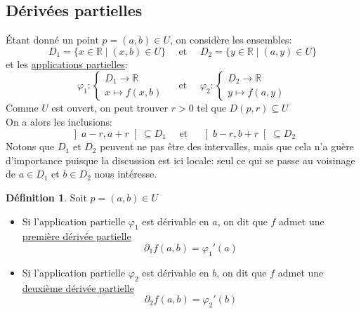 \documentclass[10pt,a4paper]{article}
\theoremstyle{definition}
\newtheorem{definition}[proposition]{Définition}
\begin{document}
\subsection{Dérivées partielles}
Étant donné un point $p = (a, b) \in U$, on considère les ensembles:
\[ D_1 = \{x \in \mathbb{R} \mid (x, b) \in U\} \quad \text{ et } \quad D_2 = \{ y \in \mathbb{R} \mid (a, y) \in U\} \]
et les \uline{applications partielles}:
\[ \varphi_1: \begin{cases}
D_1 \to \mathbb{R} \\
x \mapsto f(x, b)
\end{cases} \quad \text{ et } \quad
\varphi_2: \begin{cases}
D_2 \to \mathbb{R} \\
y \mapsto f(a, y)
\end{cases} \]
Comme $U$ est ouvert, on peut trouver $r > 0$ tel que $D(p, r) \subseteq U$ \\
On a alors les inclusions:
\[ \left] a - r, a + r \right[ \subseteq D_1 \quad \text{ et } \quad \left] b - r, b + r \right[ \subseteq D_2 \]
Notons que $D_1$ et $D_2$ peuvent ne pas être des intervalles, mais que cela n'a guère d'importance puisque la discussion est ici locale: seul ce qui se passe au voisinage de $a \in D_1$ et $b \in D_2$ nous intéresse.
\begin{definition}
Soit $p = (a, b) \in U$
\begin{itemize}
\item Si l'application partielle $\varphi_1$ est dérivable en $a$, on dit que $f$ admet une \uline{première dérivée partielle}
\[ \partial_1 f(a, b) = \varphi_1'(a) \]
\item Si l'application partielle $\varphi_2$ est dérivable en $b$, on dit que $f$ admet une \uline{deuxième dérivée partielle}
\[ \partial_2 f(a, b) = \varphi_2'(b) \]
\end{itemize}
\end{definition}
\end{document}
